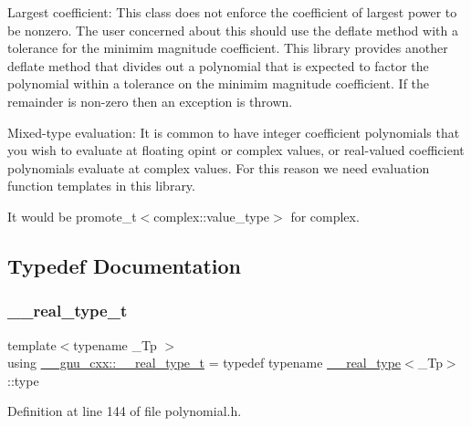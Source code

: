 Largest coefficient\+: This class does not enforce the coefficient of largest power to be nonzero. The user concerned about this should use the deflate method with a tolerance for the minimim magnitude coefficient. This library provides another deflate method that divides out a polynomial that is expected to factor the polynomial within a tolerance on the minimim magnitude coefficient. If the remainder is non-\/zero then an exception is thrown.

Mixed-\/type evaluation\+: It is common to have integer coefficient polynomials that you wish to evaluate at floating opint or complex values, or real-\/valued coefficient polynomials evaluate at complex values. For this reason we need evaluation function templates in this library.

It would be promote\+\_\+t$<$complex\+::value\+\_\+type$>$ for complex. 

\subsection{Typedef Documentation}
\mbox{\label{namespace____gnu__cxx_a3f707c0c6f6926cf68b74072733751f7}} 
\subsubsection{\texorpdfstring{\+\_\+\+\_\+real\+\_\+type\+\_\+t}{\_\_real\_type\_t}}
{\footnotesize\ttfamily template$<$typename \+\_\+\+Tp $>$ \\
using \hyperlink{namespace____gnu__cxx_a3f707c0c6f6926cf68b74072733751f7}{\+\_\+\+\_\+gnu\+\_\+cxx\+::\+\_\+\+\_\+real\+\_\+type\+\_\+t} = typedef typename \hyperlink{struct____gnu__cxx_1_1____real__type}{\+\_\+\+\_\+real\+\_\+type}$<$\+\_\+\+Tp$>$\+::type}



Definition at line 144 of file polynomial.\+h.

\mbox{\label{namespace____gnu__cxx_ae20ea642de50eb361074c62676b0159c}} 
